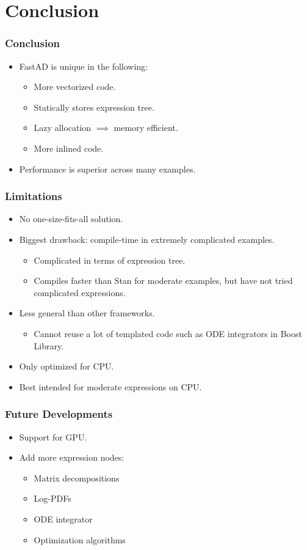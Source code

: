 \section{Conclusion}
\frame{\tableofcontents[currentsection]}

\begin{frame}
\frametitle{Conclusion}
\begin{itemize}
\item FastAD is unique in the following:
    \begin{itemize}
        \item More vectorized code.
        \item Statically stores expression tree.
        \item Lazy allocation $\implies$ memory efficient.
        \item More inlined code.
    \end{itemize}
\item Performance is superior across many examples.
\end{itemize}
\end{frame}

\begin{frame}
\frametitle{Limitations}
\begin{itemize}
\item No one-size-fits-all solution.
\item Biggest drawback: compile-time in extremely complicated examples.
    \begin{itemize}
        \item Complicated in terms of expression tree.
        \item Compiles faster than Stan for moderate examples,
            but have not tried complicated expressions.
    \end{itemize}
\item Less general than other frameworks.
    \begin{itemize}
        \item Cannot reuse a lot of templated code such as ODE integrators in Boost Library.
    \end{itemize}
\item Only optimized for CPU.\@
\item Best intended for moderate expressions on CPU.\@
\end{itemize}
\end{frame}

\begin{frame}
\frametitle{Future Developments}
\begin{itemize}
\item Support for GPU.\@
\item Add more expression nodes:\@
    \begin{itemize}
        \item Matrix decompositions
        \item Log-PDFs
        \item ODE integrator
        \item Optimization algorithms
    \end{itemize}
\end{itemize}
\end{frame}


